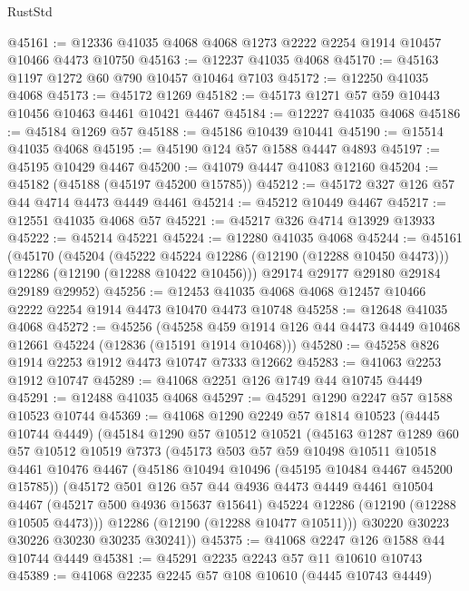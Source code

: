 \begin{lexlean}{RustStd}
\begin{coremodule}
@45161 := @12336 @41035 @4068 @4068 @1273 @2222 @2254 @1914 @10457 @10466 @4473 @10750
@45163 := @12237 @41035 @4068
@45170 := @45163 @1197 @1272 @60 @790 @10457 @10464 @7103
@45172 := @12250 @41035 @4068
@45173 := @45172 @1269
@45182 := @45173 @1271 @57 @59 @10443 @10456 @10463 @4461 @10421 @4467
@45184 := @12227 @41035 @4068
@45186 := @45184 @1269 @57
@45188 := @45186 @10439 @10441
@45190 := @15514 @41035 @4068
@45195 := @45190 @124 @57 @1588 @4447 @4893
@45197 := @45195 @10429 @4467
@45200 := @41079 @4447 @41083 @12160
@45204 := @45182 (@45188 (@45197 @45200 @15785))
@45212 := @45172 @327 @126 @57 @44 @4714 @4473 @4449 @4461
@45214 := @45212 @10449 @4467
@45217 := @12551 @41035 @4068 @57
@45221 := @45217 @326 @4714 @13929 @13933
@45222 := @45214 @45221
@45224 := @12280 @41035 @4068
@45244 := @45161
    (@45170
      (@45204
        (@45222 @45224 @12286 (@12190 (@12288 @10450 @4473)))
        @12286
        (@12190 (@12288 @10422 @10456)))
      @29174
      @29177
      @29180
      @29184
      @29189
      @29952)
@45256 := @12453 @41035 @4068 @4068 @12457 @10466 @2222 @2254 @1914 @4473 @10470 @4473 @10748
@45258 := @12648 @41035 @4068
@45272 := @45256
    (@45258 @459 @1914 @126 @44 @4473 @4449 @10468 @12661 @45224 (@12836 (@15191 @1914 @10468)))
@45280 := @45258 @826 @1914 @2253 @1912 @4473 @10747 @7333 @12662
@45283 := @41063 @2253 @1912 @10747
@45289 := @41068 @2251 @126 @1749 @44 @10745 @4449
@45291 := @12488 @41035 @4068
@45297 := @45291 @1290 @2247 @57 @1588 @10523 @10744
@45369 := @41068
    @1290
    @2249
    @57
    @1814
    @10523
    (@4445 @10744 @4449)
    (@45184
      @1290
      @57
      @10512
      @10521
      (@45163
        @1287
        @1289
        @60
        @57
        @10512
        @10519
        @7373
        (@45173
          @503
          @57
          @59
          @10498
          @10511
          @10518
          @4461
          @10476
          @4467
          (@45186 @10494 @10496 (@45195 @10484 @4467 @45200 @15785))
          (@45172
            @501
            @126
            @57
            @44
            @4936
            @4473
            @4449
            @4461
            @10504
            @4467
            (@45217 @500 @4936 @15637 @15641)
            @45224
            @12286
            (@12190 (@12288 @10505 @4473)))
          @12286
          (@12190 (@12288 @10477 @10511)))
        @30220
        @30223
        @30226
        @30230
        @30235
        @30241))
@45375 := @41068 @2247 @126 @1588 @44 @10744 @4449
@45381 := @45291 @2235 @2243 @57 @11 @10610 @10743
@45389 := @41068 @2235 @2245 @57 @108 @10610 (@4445 @10743 @4449)

\end{coremodule}
\end{lexlean}
